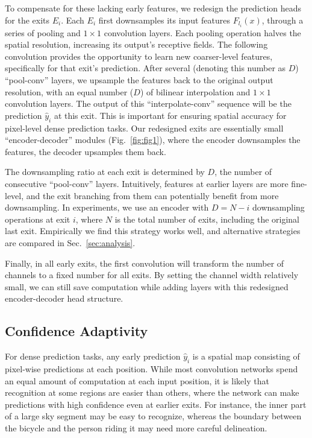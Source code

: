 To compensate for these lacking early features, we redesign the prediction heads for the exits $E_i$.
Each $E_i$ first downsamples its input features $F_{l_i}(x)$, through a series of pooling and $1\times1$ convolution layers.
Each pooling operation halves the spatial resolution, increasing its output's receptive fields.
The following convolution provides the opportunity to learn new coarser-level features, specifically for that exit's prediction.  
After several (denoting this number as $D$) ``pool-conv'' layers, we upsample the features back to the original output resolution, with an equal number ($D$) of bilinear interpolation and $1\times1$ convolution layers.
The output of this ``interpolate-conv'' sequence will be the prediction $\hat{y}_i$ at this exit.
This is important for ensuring spatial accuracy for pixel-level dense prediction tasks.
Our redesigned exits are essentially small ``encoder-decoder'' modules (Fig.~\ref{fig:fig1}), where the encoder downsamples the features, the decoder upsamples them back.

The downsampling ratio at each exit is determined by $D$, the number of consecutive ``pool-conv'' layers.
Intuitively, features at earlier layers are more fine-level, and the exit branching from them can potentially benefit from more downsampling.
In experiments, we use an encoder with $D=N-i$ downsampling operations at exit $i$, where $N$ is the total number of exits, including the original last exit.
Empirically we find this strategy works well, and alternative strategies are compared in Sec.~\ref{sec:analysis}. 

Finally, in all early exits, the first convolution will transform the number of channels to a fixed number for all exits.
By setting the channel width relatively small, we can still save computation while adding layers with this redesigned encoder-decoder head structure.

\subsection{Confidence Adaptivity}
For dense prediction tasks, any early prediction $\hat{y}_i$ is a spatial map consisting of pixel-wise predictions at each position.
While most convolution networks spend an equal amount of computation at each input position, it is likely that recognition at some regions are easier than others, where the network can make predictions with high confidence even at earlier exits.
For instance, the inner part of a large sky segment may be easy to recognize, whereas the boundary between the bicycle and the person riding it may need more careful delineation.

